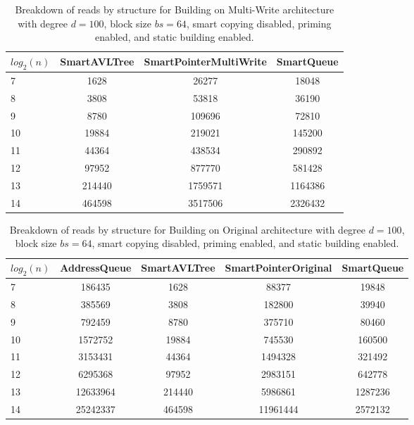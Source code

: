\begin{table}[]
\centering
\begin{tabular}{|l|c|c|c|}
$log_2(n)$ & SmartAVLTree & SmartPointerMultiWrite & SmartQueue \\ \hline
7 & 1628 & 26277 & 18048 \\ \hline
8 & 3808 & 53818 & 36190 \\ \hline
9 & 8780 & 109696 & 72810 \\ \hline
10 & 19884 & 219021 & 145200 \\ \hline
11 & 44364 & 438534 & 290892 \\ \hline
12 & 97952 & 877770 & 581428 \\ \hline
13 & 214440 & 1759571 & 1164386 \\ \hline
14 & 464598 & 3517506 & 2326432 \\ \hline
\end{tabular}
\caption{Breakdown of reads by structure for Building on Multi-Write architecture with degree $d=100$, block size $bs=64$, smart copying disabled, priming enabled, and static building enabled.}
    \label{tab:reads_by_structure_build_d100_bs64_copiesfalse_primetrue_staticinsertiontrue_ptmultiwrite_movetrue}
\end{table}

\begin{table}[]
\centering
\begin{tabular}{|l|c|c|c|c|}
$log_2(n)$ & AddressQueue & SmartAVLTree & SmartPointerOriginal & SmartQueue \\ \hline
7 & 186435 & 1628 & 88377 & 19848 \\ \hline
8 & 385569 & 3808 & 182800 & 39940 \\ \hline
9 & 792459 & 8780 & 375710 & 80460 \\ \hline
10 & 1572752 & 19884 & 745530 & 160500 \\ \hline
11 & 3153431 & 44364 & 1494328 & 321492 \\ \hline
12 & 6295368 & 97952 & 2983151 & 642778 \\ \hline
13 & 12633964 & 214440 & 5986861 & 1287236 \\ \hline
14 & 25242337 & 464598 & 11961444 & 2572132 \\ \hline
\end{tabular}
\caption{Breakdown of reads by structure for Building on Original architecture with degree $d=100$, block size $bs=64$, smart copying disabled, priming enabled, and static building enabled.}
    \label{tab:reads_by_structure_build_d100_bs64_copiesfalse_primetrue_staticinsertiontrue_ptoriginal_movefalse}
\end{table}

